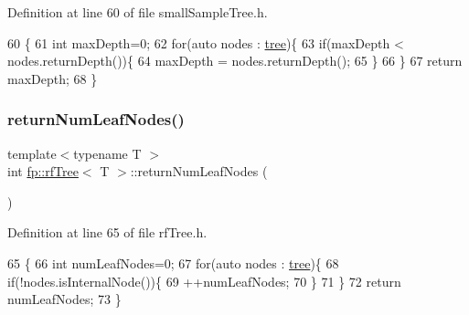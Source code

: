 Definition at line 60 of file small\+Sample\+Tree.\+h.


\begin{DoxyCode}
60                                            \{
61                     \textcolor{keywordtype}{int} maxDepth=0;
62                     \textcolor{keywordflow}{for}(\textcolor{keyword}{auto} nodes : \hyperlink{classfp_1_1rfTree_a1d5c209715f4044a85878c17e2b3ee53}{tree})\{
63                         \textcolor{keywordflow}{if}(maxDepth < nodes.returnDepth())\{
64                             maxDepth = nodes.returnDepth();
65                         \}
66                     \}
67                     \textcolor{keywordflow}{return} maxDepth;
68                 \}
\end{DoxyCode}
\mbox{\label{classfp_1_1rfTree_a6474edd1b84d70be1712326f9a845139}} 
\subsubsection{\texorpdfstring{return\+Num\+Leaf\+Nodes()}{returnNumLeafNodes()}\hspace{0.1cm}{\footnotesize\ttfamily [1/2]}}
{\footnotesize\ttfamily template$<$typename T $>$ \\
int \hyperlink{classfp_1_1rfTree}{fp\+::rf\+Tree}$<$ T $>$\+::return\+Num\+Leaf\+Nodes (\begin{DoxyParamCaption}{ }\end{DoxyParamCaption})\hspace{0.3cm}{\ttfamily [inline]}}



Definition at line 65 of file rf\+Tree.\+h.


\begin{DoxyCode}
65                                                \{
66                     \textcolor{keywordtype}{int} numLeafNodes=0;
67                     \textcolor{keywordflow}{for}(\textcolor{keyword}{auto} nodes : \hyperlink{classfp_1_1rfTree_a1d5c209715f4044a85878c17e2b3ee53}{tree})\{
68                         \textcolor{keywordflow}{if}(!nodes.isInternalNode())\{
69                             ++numLeafNodes;
70                         \}
71                     \}
72                     \textcolor{keywordflow}{return} numLeafNodes;
73                 \}
\end{DoxyCode}
\mbox{\label{classfp_1_1rfTree_a6474edd1b84d70be1712326f9a845139}} 
